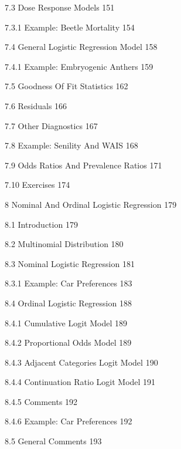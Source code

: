 7.3 Dose Response Models 151



7.3.1 Example: Beetle Mortality 154



7.4 General Logistic Regression Model 158



7.4.1 Example: Embryogenic Anthers 159



7.5 Goodness Of Fit Statistics 162



7.6 Residuals 166



7.7 Other Diagnostics 167



7.8 Example: Senility And WAIS 168



7.9 Odds Ratios And Prevalence Ratios 171



7.10 Exercises 174



8 Nominal And Ordinal Logistic Regression 179



8.1 Introduction 179



8.2 Multinomial Distribution 180



8.3 Nominal Logistic Regression 181



8.3.1 Example: Car Preferences 183



8.4 Ordinal Logistic Regression 188



8.4.1 Cumulative Logit Model 189



8.4.2 Proportional Odds Model 189



8.4.3 Adjacent Categories Logit Model 190



8.4.4 Continuation Ratio Logit Model 191



8.4.5 Comments 192



8.4.6 Example: Car Preferences 192



8.5 General Comments 193




